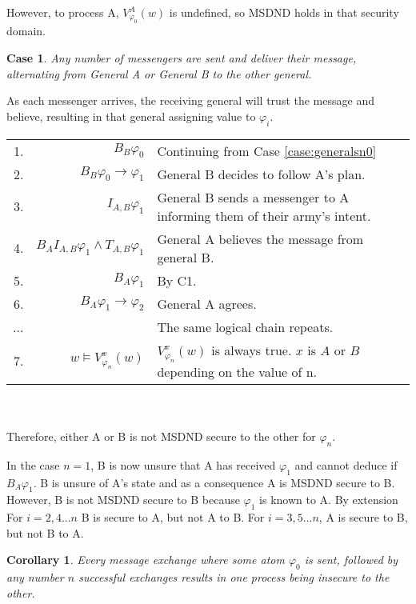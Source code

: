 \documentclass[12pt,oneside]{article}
\newtheorem{case}{Case}[thm]
\newtheorem{cor}[thm]{Corollary}
\begin{document}
However, to process A, $V_{\varphi_{0}}^A(w)$ is undefined, so MSDND holds in that security domain. 

\begin{case}
Any number of messengers are sent and deliver their message, alternating from General A or General B to the other general. \label{case:generalsnn}
\end{case}

As each messenger arrives, the receiving general will trust the message and believe, resulting in that general assigning value to $\varphi_i$.

\begin{table*}[h!]
\centering
\begin{tabular}{r r l}
1. & $B_{B} \varphi_0$ & Continuing from Case \ref{case:generalsn0} \\
2. & $B_{B} \varphi_0 \rightarrow \varphi_1$ & General B decides to follow A's plan. \\
3. & $I_{A,B} \varphi_1$ & General B sends a messenger to A informing them of their army's intent. \\
4. & $B_{A}I_{A,B} \varphi_1 \wedge T_{A,B} \varphi_1$ & General A believes the message from general B. \\
5. & $B_{A}\varphi_1$ & By C1. \\
6. & $B_{A}\varphi_1 \rightarrow \varphi_2$ & General A agrees. \\
...& & The same logical chain repeats. \\
7. & $w \vDash V_{\varphi_n}^{x}(w)$ & $V_{\varphi_n}^{x}(w)$ is always true. $x$ is $A$ or $B$ depending on the value of n. %
\end{tabular} \\~\\
Therefore, either A or B is not MSDND secure to the other for $\varphi_n$.
\label{tab:twoarmiesproof}
\end{table*}

In the case $n=1$, B is now unsure that A has received $\varphi_1$ and cannot deduce if $B_{A} \varphi_1$. B is unsure of A's state and as a consequence A is MSDND secure to B. However, B is not MSDND secure to B because $\varphi_1$ is known to A. By extension For $i=2,4...n$ B is secure to A, but not A to B. For $i=3,5...n$, A is secure to B, but not B to A.

\begin{cor}
Every message exchange where some atom $\varphi_0$ is sent, followed by any number $n$ successful exchanges results in one process being insecure to the other.
\end{cor}
\end{document}
